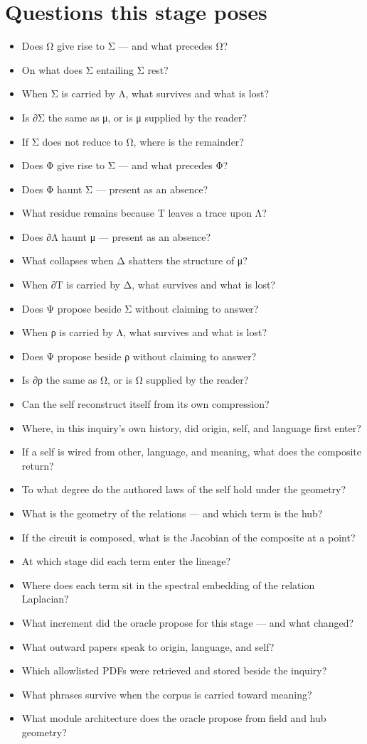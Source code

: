 \documentclass[11pt]{article}
\begin{document}
\section*{Questions this stage poses}\begin{itemize}\item Does Ω give rise to Σ — and what precedes Ω?
\item On what does Σ entailing Σ rest?
\item When Σ is carried by Λ, what survives and what is lost?
\item Is ∂Σ the same as μ, or is μ supplied by the reader?
\item If Σ does not reduce to Ω, where is the remainder?
\item Does Φ give rise to Σ — and what precedes Φ?
\item Does Φ haunt Σ — present as an absence?
\item What residue remains because Τ leaves a trace upon Λ?
\item Does ∂Λ haunt μ — present as an absence?
\item What collapses when Δ shatters the structure of μ?
\item When ∂Τ is carried by Δ, what survives and what is lost?
\item Does Ψ propose beside Σ without claiming to answer?
\item When ρ is carried by Λ, what survives and what is lost?
\item Does Ψ propose beside ρ without claiming to answer?
\item Is ∂ρ the same as Ω, or is Ω supplied by the reader?
\item Can the self reconstruct itself from its own compression?
\item Where, in this inquiry's own history, did origin, self, and language first enter?
\item If a self is wired from other, language, and meaning, what does the composite return?
\item To what degree do the authored laws of the self hold under the geometry?
\item What is the geometry of the relations — and which term is the hub?
\item If the circuit is composed, what is the Jacobian of the composite at a point?
\item At which stage did each term enter the lineage?
\item Where does each term sit in the spectral embedding of the relation Laplacian?
\item What increment did the oracle propose for this stage — and what changed?
\item What outward papers speak to origin, language, and self?
\item Which allowlisted PDFs were retrieved and stored beside the inquiry?
\item What phrases survive when the corpus is carried toward meaning?
\item What module architecture does the oracle propose from field and hub geometry?\end{itemize}
\end{document}
